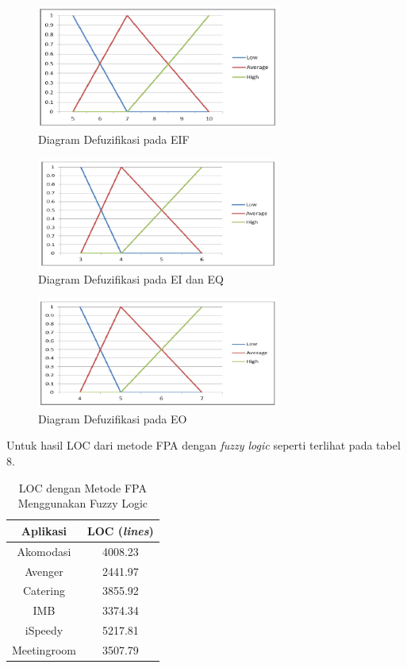 \documentclass[a4paper]{article}
\begin{document}
\begin{multicols}{2}
\begin{figure}[H]
    \centering
    \includegraphics[width=8cm]{gambar9diagramdefuzifikasi.png}
    \caption{Diagram Defuzifikasi pada EIF}
    \label{gb9}
\end{figure}

\begin{figure}[H]
    \centering
    \includegraphics[width=8cm]{gambar10diagramdefuzifikasi.png}
    \caption{Diagram Defuzifikasi pada EI dan EQ}
    \label{gb10}
\end{figure}

\begin{figure}[H]
    \centering
    \includegraphics[width=8cm]{gambar11diagramdefuzifikasi.png}
    \caption{Diagram Defuzifikasi pada EO}
    \label{gb11}
\end{figure}

\par Untuk hasil LOC dari metode FPA dengan \textit{fuzzy logic} seperti terlihat pada tabel 8.

\begin{table}[H]
    \centering
    \caption{LOC dengan Metode FPA Menggunakan Fuzzy Logic}
    \bigskip
    \begin{tabular}{|c|c|}
        \hline
        \textbf{Aplikasi} & \textbf{LOC (\textit{lines})}\\
        \hline
        Akomodasi & 4008.23\\
        Avenger & 2441.97\\
        Catering & 3855.92\\
        IMB & 3374.34\\
        iSpeedy & 5217.81\\
        Meetingroom & 3507.79\\
        \hline
    \end{tabular}
    \label{tab8}
\end{table}


\end{multicols}
\end{document}
